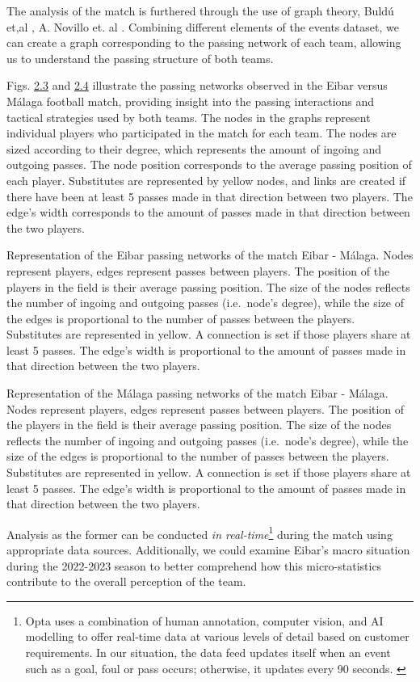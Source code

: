 \documentclass[twoside,nohyper]{tufte-book}
\begin{document}
The analysis of the match is furthered through the use of graph theory,
Buldú et,al \citep{Buldu}, A. Novillo et. al \citep{NOVILLO2024114355}. Combining
different elements of the events dataset, we can create a graph
corresponding to the passing network of each team, allowing us to
understand the passing structure of both teams.

Figs. \protect\hyperlink{f2.3}{2.3} and
\protect\hyperlink{f2.4}{2.4} illustrate the
passing networks observed in the Eibar versus Málaga football match,
providing insight into the passing interactions and tactical strategies
used by both teams. The nodes in the graphs represent individual players
who participated in the match for each team. The nodes are sized
according to their degree, which represents the amount of ingoing and
outgoing passes. The node position corresponds to the average passing
position of each player. Substitutes are represented by yellow nodes,
and links are created if there have been at least 5 passes made in that
direction between two players. The edge's width corresponds to the
amount of passes made in that direction between the two players.

Representation of the Eibar passing networks of the match
Eibar - Málaga. Nodes represent players, edges represent passes between
players. The position of the players in the field is their average
passing position. The size of the nodes reflects the number of ingoing
and outgoing passes (i.e.~node's degree), while the size of the edges is
proportional to the number of passes between the players. Substitutes
are represented in yellow. A connection is set if those players share at
least 5 passes. The edge's width is proportional to the amount of passes
made in that direction between the two players.

Representation of the Málaga passing networks of the match
Eibar - Málaga. Nodes represent players, edges represent passes between
players. The position of the players in the field is their average
passing position. The size of the nodes reflects the number of ingoing
and outgoing passes (i.e.~node's degree), while the size of the edges is
proportional to the number of passes between the players. Substitutes
are represented in yellow. A connection is set if those players share at
least 5 passes. The edge's width is proportional to the amount of passes
made in that direction between the two players.

Analysis as the former can be conducted \emph{in real-time}\footnote{Opta uses a combination of human annotation, computer vision, and
  AI modelling to offer real-time data at various levels of detail
  based on customer requirements. In our situation, the data feed
  updates itself when an event such as a goal, foul or pass occurs;
  otherwise, it updates every 90 seconds. \citep{opta}} during the
match using appropriate data sources. Additionally, we could examine
Eibar's macro situation during the 2022-2023 season to better comprehend
how this micro-statistics contribute to the overall perception of the
team.
\end{document}
